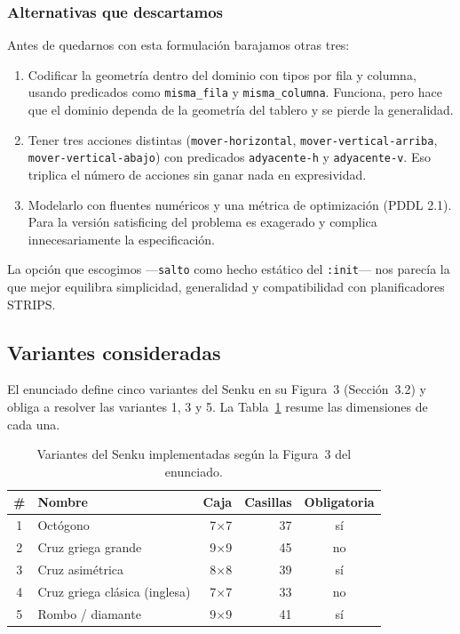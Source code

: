 \documentclass[conference,a4paper]{IEEEtran}
\begin{document}
\subsubsection{Alternativas que descartamos}

Antes de quedarnos con esta formulación barajamos otras tres:

\begin{enumerate}
\item Codificar la geometría dentro del dominio con tipos por fila y
  columna, usando predicados como \texttt{misma\_fila} y
  \texttt{misma\_columna}. Funciona, pero hace que el dominio dependa de
  la geometría del tablero y se pierde la generalidad.
\item Tener tres acciones distintas (\texttt{mover-horizontal},
  \texttt{mover-vertical-arriba}, \texttt{mover-vertical-abajo}) con
  predicados \texttt{adyacente-h} y \texttt{adyacente-v}. Eso triplica el
  número de acciones sin ganar nada en expresividad.
\item Modelarlo con fluentes numéricos y una métrica de optimización
  (PDDL 2.1). Para la versión satisficing del problema es exagerado y
  complica innecesariamente la especificación.
\end{enumerate}

La opción que escogimos ---\texttt{salto} como hecho estático del
\texttt{:init}--- nos parecía la que mejor equilibra simplicidad,
generalidad y compatibilidad con planificadores STRIPS.


\subsection{Variantes consideradas}

El enunciado define cinco variantes del Senku en su Figura~3 (Sección~3.2)
y obliga a resolver las variantes 1, 3 y 5. La Tabla~\ref{tab:variantes}
resume las dimensiones de cada una.

\begin{table}[H]
\caption{Variantes del Senku implementadas según la Figura~3 del enunciado.}
\label{tab:variantes}
\centering
\begin{tabular}{clrrc}
\toprule
\textbf{\#} & \textbf{Nombre} & \textbf{Caja} & \textbf{Casillas} & \textbf{Obligatoria} \\
\midrule
1 & Octógono                       & 7$\times$7 & 37 & sí \\
2 & Cruz griega grande             & 9$\times$9 & 45 & no \\
3 & Cruz asimétrica                & 8$\times$8 & 39 & sí \\
4 & Cruz griega clásica (inglesa)  & 7$\times$7 & 33 & no \\
5 & Rombo / diamante               & 9$\times$9 & 41 & sí \\
\bottomrule
\end{tabular}
\end{table}
\end{document}
